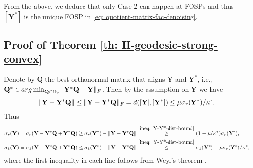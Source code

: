 \documentclass[11pt]{article}
\newcommand{\0}{{\mathbf{0}}}
\newcommand{\1}{{\mathbf{1}}}
\newcommand{\Q}{{\mathbf{Q}}}
\newcommand{\Y}{{\mathbf{Y}}}
\newcommand{\F}{{\rm F}}
\newcommand{\argmin}{\mathop{\rm arg\min}}
\newcommand{\bbO}{\mathbb{O}}
\newcommand{\nc}{\normalcolor}
\begin{document}
From the above, we deduce that only Case 2 can happen at FOSPs and thus $[\Y^*]$ is the unique FOSP in \eqref{eq: quotient-matrix-fac-denoising}.

\subsection{Proof of Theorem \ref{th: H-geodesic-strong-convex}}
Denote by $\Q$ the best orthonormal \nc matrix that aligns $\Y$ and $\Y^*$, i.e., $\Q^* \in \argmin_{\Q \in \bbO_r} \|\Y^* \Q - \Y\|_\F$. Then by the assumption on $\Y$ we have 
\begin{equation} \label{ineq: Y-Y*-dist-bound}
 	\| \Y - \Y^* \Q \| \nc \leq	\| \Y - \Y^* \Q \|_\F =  d([\Y],[\Y^*]) \leq \mu  \sigma_r(\Y^*)/\kappa^*.  
\end{equation}
Thus 
\begin{equation} \label{ineq: spectrum-bound-of-Y}
	\begin{split}
		\sigma_r(\Y) &= \sigma_r(\Y - \Y^* \Q + \Y^* \Q ) \geq \sigma_r(\Y^*) - \|\Y - \Y^* \Q\|  \overset{ \eqref{ineq: Y-Y*-dist-bound} } \geq (1 - \mu/ \kappa^* ) \sigma_r(\Y^*),\\
		\sigma_1(\Y) &= \sigma_1(\Y - \Y^* \Q + \Y^* \Q  ) \leq \sigma_1(\Y^*) + \|\Y - \Y^* \Q\| \overset{ \eqref{ineq: Y-Y*-dist-bound} } \leq \sigma_1(\Y^*) +  \mu \sigma_r(\Y^*)/ \kappa^*,
	\end{split}
\end{equation}
 where the first inequality in each line follows from Weyl's theorem \cite[Theorem  4.29]{stewart1998matrix}.\nc
\end{document}
